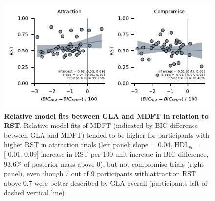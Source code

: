 \documentclass[11pt, a4paper]{article}
\begin{document}
\begin{refsection}
\begin{figure}[ht!]
\begin{centering}
\includegraphics[scale=1]{../figures/S_GLA-vs-MDFT_dBIC_RST.pdf}
\caption{\textbf{Relative model fits between GLA and MDFT in relation to RST}. Relative model fits of MDFT (indicated by BIC difference between GLA and MDFT) tended to be higher for participants with higher RST in attraction trials (left panel; slope = 0.04, HDI$_{95}$ = [-0.01, 0.09] increase in RST per 100 unit increase in BIC difference, 93.6\% of posterior mass above 0), but not compromise trials (right panel), even though 7 out of 9 participants with attraction RST above 0.7 were better described by GLA overall (participants left of dashed vertical line).}
\label{fig:dbic-rst}
\end{centering}
\end{figure}
\clearpage

\begin{table}

\end{table}
\end{refsection}
\end{document}
